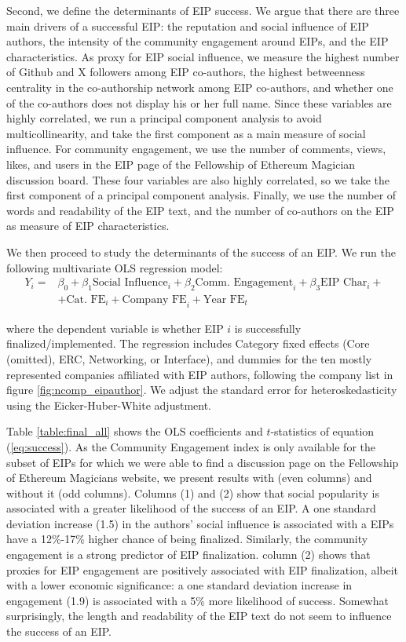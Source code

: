 \documentclass[No]{AEA}
\begin{document}
Second, we define the determinants of EIP success. We argue that there are three main drivers of a successful EIP: the reputation and social influence of EIP authors, the intensity of the community engagement around EIPs, and the EIP characteristics. As proxy for EIP social influence, we measure the highest number of Github and X followers among EIP co-authors, the highest betweenness centrality in the co-authorship network among EIP co-authors, and whether one of the co-authors does not display his or her full name. Since these variables are highly correlated, we run a principal component analysis to avoid multicollinearity, and take the first component as a main measure of social influence. For community engagement, we use the number of comments, views, likes, and users in the EIP page of the Fellowship of Ethereum Magician discussion board. These four variables are also highly correlated, so we take the first component of a principal component analysis. Finally, we use the number of words and readability of the EIP text, and the number of co-authors on the EIP as measure of EIP characteristics. 

We then proceed to study the determinants of the success of an EIP. We run the following multivariate OLS regression model:
\begin{equation}
\begin{split}   
  Y_i  =& \beta_0 + \beta_1 \text{Social Influence}_i + \beta_2 \text{Comm. Engagement}_i + \beta_{3} \text{EIP Char}_i +  \\ & + \text{Cat. FE}_i + \text{Company FE}_i  + \text{Year FE}_t   \label{eq:success}
\end{split}
\end{equation}

where the dependent variable is whether EIP $i$ is successfully finalized/implemented. The regression includes Category fixed effects (Core (omitted), ERC, Networking, or Interface), and dummies for the ten mostly represented companies affiliated with EIP authors, following the company list in figure \ref{fig:ncomp_eipauthor}. We adjust the standard error for heteroskedasticity using the Eicker-Huber-White adjustment. 

Table \ref{table:final_all} shows the OLS coefficients and $t$-statistics of equation (\ref{eq:success}). As the Community Engagement index is only available for the subset of EIPs for which we were able to find a discussion page on the Fellowship of Ethereum Magicians website, we present results with (even columns) and without it (odd columns). Columns (1) and (2) show that social popularity is associated with a greater likelihood of the success of an EIP. A one standard deviation increase (1.5) in the authors' social influence is associated with a EIPs have a 12\%-17\% higher chance of being finalized. Similarly, the community engagement is a strong predictor of EIP finalization. column (2) shows that proxies for EIP engagement are positively associated with EIP finalization, albeit with a lower economic significance: a one standard deviation increase in engagement (1.9) is associated with a 5\% more likelihood of success. Somewhat surprisingly, the length and readability of the EIP text do not seem to influence the success of an EIP. 
\end{document}
